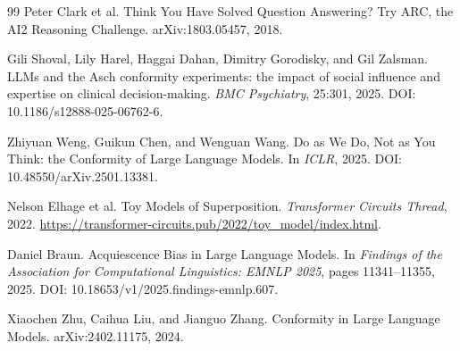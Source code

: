 \documentclass[sigconf,nonacm]{acmart}
\begin{document}
\begin{thebibliography}{99}
Peter Clark et al.
\newblock Think You Have Solved Question Answering? Try ARC, the AI2 Reasoning Challenge.
\newblock arXiv:1803.05457, 2018.

Gili Shoval, Lily Harel, Haggai Dahan, Dimitry Gorodisky, and Gil Zalsman.
\newblock LLMs and the Asch conformity experiments: the impact of social influence and expertise on clinical decision-making.
\newblock \emph{BMC Psychiatry}, 25:301, 2025.
\newblock DOI: 10.1186/s12888-025-06762-6.

Zhiyuan Weng, Guikun Chen, and Wenguan Wang.
\newblock Do as We Do, Not as You Think: the Conformity of Large Language Models.
\newblock In \emph{ICLR}, 2025.
\newblock DOI: 10.48550/arXiv.2501.13381.

Nelson Elhage et al.
\newblock Toy Models of Superposition.
\newblock \emph{Transformer Circuits Thread}, 2022.
\newblock \url{https://transformer-circuits.pub/2022/toy_model/index.html}.

Daniel Braun.
\newblock Acquiescence Bias in Large Language Models.
\newblock In \emph{Findings of the Association for Computational Linguistics: EMNLP 2025}, pages 11341--11355, 2025.
\newblock DOI: 10.18653/v1/2025.findings-emnlp.607.

Xiaochen Zhu, Caihua Liu, and Jianguo Zhang.
\newblock Conformity in Large Language Models.
\newblock arXiv:2402.11175, 2024.

\end{thebibliography}
\end{document}
